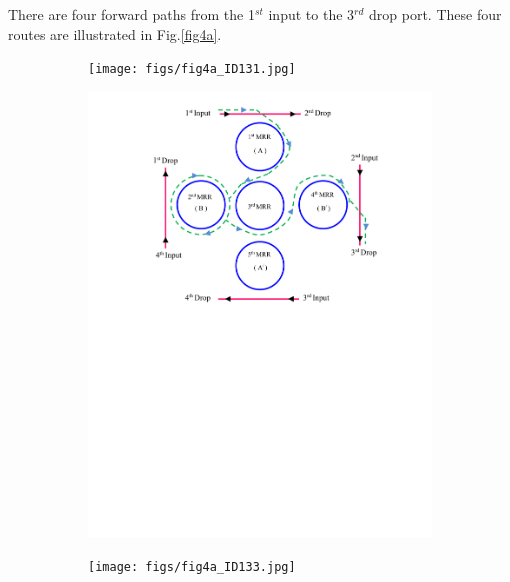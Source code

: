 \documentclass{osa-article}
\begin{document}
There are four forward paths from the 1$^{st}$ input to the 3$^{rd}$ drop port.  These four routes are illustrated in Fig.\ref{fig4a}.
\begin{figure}[h!]
  \centering
  \begin{subfigure}[b]{0.4\linewidth}
    \texttt{[image: figs/fig4a\_ID131.jpg]}
    \caption{}
  \end{subfigure}
  \begin{subfigure}[b]{0.4\linewidth}
    \includegraphics[width=\linewidth]{figs/fig4a_ID132.pdf}
    \caption{}
  \end{subfigure}
  \begin{subfigure}[b]{0.4\linewidth}
    \texttt{[image: figs/fig4a\_ID133.jpg]}
    \caption{}
  \end{subfigure}
  \begin{subfigure}[b]{0.4\linewidth}

\end{subfigure}
\end{figure}
\end{document}
